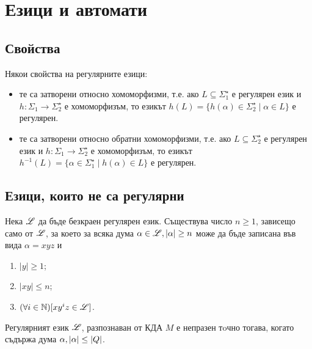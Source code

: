\chapter{Езици и автомати}

\section{Свойства}

Някои свойства на регулярните езици:
\begin{itemize}
\item 
  те са затворени относно хомоморфизми, т.е.
  ако $L \subseteq \Sigma^\star_1$ е регулярен език и $h:\Sigma_1\to\Sigma^\star_2$ е хомоморфизъм, 
  то езикът $h(L) = \{h(\alpha) \in \Sigma^\star_2 \mid \alpha \in L\}$
  е регулярен.
\item
  те са затворени относно обратни хомоморфизми, т.е.
  ако $L\subseteq \Sigma^\star_2$ е регулярен език и $h:\Sigma_1\to\Sigma^\star_2$ е хомоморфизъм, 
  то езикът $h^{-1}(L) = \{\alpha \in \Sigma^\star_1 \mid h(\alpha) \in L\}$
  е регулярен.
\end{itemize}

\section{Езици, които не са регулярни}
\begin{lemma}
  Нека $\mathscr{L}$ да бъде безкраен регулярен език.
  Съществува число $n\geq 1$, зависещо само от $\mathscr{L}$, 
  за което за всяка дума $\alpha\in \mathscr{L}, \vert{\alpha}\vert\geq n$ може да 
  бъде записана във вида $\alpha = xyz$ и 
  \begin{enumerate}
  \item
    $|y|\geq 1$;
  \item
    $|xy|\leq n$;
  \item
    $(\forall i\in\mathbb{N})[xy^iz \in \mathscr{L}]$.
  \end{enumerate}
\end{lemma}

\begin{crl}
  Регулярният език $\mathscr{L}$, 
  разпознаван от КДА $M$ е непразен тoчно тогава, когато съдържа дума $\alpha, \vert{\alpha}\vert \leq \vert{Q}\vert$.
\end{crl}

